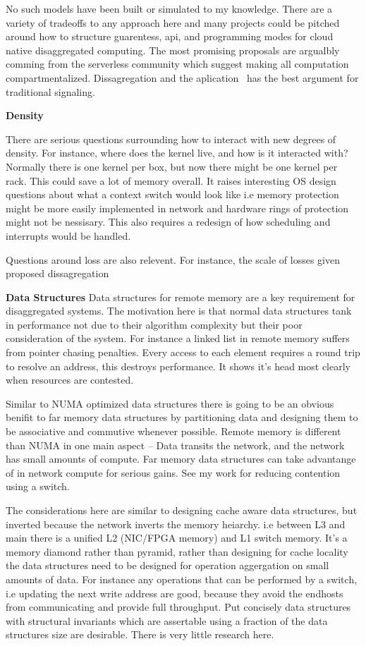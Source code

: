 No such models have been built or simulated to my knowledge. There are a variety
of tradeoffs to any approach here and many projects could be pitched around how
to structure guarentess, api, and programming modes for cloud native
disaggregated computing. The most promising proposals are argualbly comming from
the serverless community which suggest making all computation compartmentalized.
Dissagregation and the aplication~\cite{ddcaps} has the best argument for
traditional signaling.

\textbf{Density}

There are serious questions surrounding how to interact with new degrees of
density. For instance, where does the kernel live, and how is it interacted
with? Normally there is one kernel per box, but now there might be one kernel
per rack. This could save a lot of memory overall. It raises interesting OS
design questions about what a context switch would look like i.e memory
protection might be more easily implemented in network and hardware rings of
protection might not be nessisary. This also requires a redesign of how
scheduling and interrupts would be handled.

Questions around loss are also relevent. For instance, the scale of losses given
proposed dissagregation


\textbf{Data Structures} Data structures for remote memory are a key requirement
for disaggregated systems. The motivation here is that normal data structures
tank in performance not due to their algorithm complexity but their poor
consideration of the system. For instance a linked list in remote memory suffers
from pointer chasing penalties. Every access to each element requires a round
trip to resolve an address, this destroys performance. It shows it's head most
clearly when resources are contested.

Similar to NUMA optimized data structures there is going to be an obvious
benifit to far memory data structures by partitioning data and designing them to
be associative and commutive whenever possible. Remote memory is different than
NUMA in one main aspect -- Data transits the network, and the network has small
amounts of compute. Far memory data structures can take advantange of in network
compute for serious gains. See my work for reducing contention using a switch.

The considerations here are similar to designing cache aware data structures,
but inverted because the network inverts the memory heiarchy. i.e between L3 and
main there is a unified L2 (NIC/FPGA memory) and L1 switch memory. It's a memory
diamond rather than pyramid, rather than designing for cache locality the data
structures need to be designed for operation aggergation on small amounts of
data. For instance any operations that can be performed by a switch, i.e
updating the next write address are good, because they avoid the endhosts from
communicating and provide full throughput. Put concisely data structures with
structural invariants which are assertable using a fraction of the data
structures size are desirable. There is very little research here.

